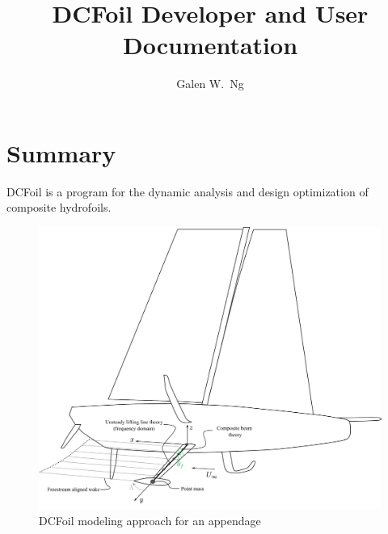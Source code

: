 \documentclass[10pt]{article}
\begin{document}
\title{\vspace{-1.5cm} DCFoil Developer and User Documentation}
\author{Galen W.~Ng}
\maketitle
\section*{Summary}
% 
DCFoil is a program for the dynamic analysis and design optimization of composite hydrofoils.
\begin{figure}[htbp!]
	\centering
	\includegraphics[width=1.0\linewidth,clip,trim={0cm 0cm 0cm 10cm}]{keel-dcfoil.pdf}
	\caption{\label{fig:keel-dcfoil}
		DCFoil modeling approach for an appendage
	}
\end{figure}

\clearpage
\tableofcontents
\clearpage
\end{document}

